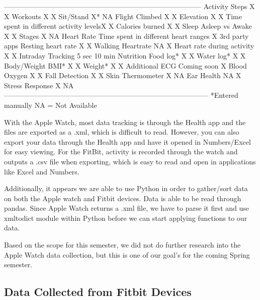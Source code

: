 \documentclass[]{book}
\begin{document}
---------------\textbar{}---------------------------------------\textbar{}---------------\textbar{}---------------
Activity \textbar{}Steps \textbar{}X \textbar{}X \textbar{}Workouts
\textbar{}X \textbar{}X \textbar{}Sit/Stand \textbar{}X* \textbar{}NA
\textbar{}Flight Climbed \textbar{}X \textbar{}X \textbar{}Elevation
\textbar{}X \textbar{}X \textbar{}Time spent in different activity
levels\textbar{}X \textbar{}X \textbar{}Calories burned \textbar{}X
\textbar{}X Sleep \textbar{}Asleep vs Awake \textbar{}X \textbar{}X
\textbar{}Stages \textbar{}X \textbar{}NA Heart Rate \textbar{}Time
spent in different heart ranges \textbar{}X \textbar{}3rd party apps
\textbar{}Resting heart rate \textbar{}X \textbar{}X \textbar{}Walking
Heartrate \textbar{}NA \textbar{}X \textbar{}Heart rate during activity
\textbar{}X \textbar{}X \textbar{}Intraday Tracking \textbar{}5 sec
\textbar{}10 min Nutrition \textbar{}Food log* \textbar{}X \textbar{}X
\textbar{}Water log* \textbar{}X \textbar{}X Body/Weight \textbar{}BMI*
\textbar{}X \textbar{}X \textbar{}Weight* \textbar{}X \textbar{}X
Additional \textbar{}ECG \textbar{}Coming soon \textbar{}X
\textbar{}Blood Oxygen \textbar{}X \textbar{}X \textbar{}Fall Detection
\textbar{}X \textbar{}X \textbar{}Skin Thermometer \textbar{}X
\textbar{}NA \textbar{}Ear Health \textbar{}NA \textbar{}X
\textbar{}Stress Response \textbar{}X \textbar{}NA
---------------------------------------------------------------------------------------
*Entered manually NA = Not Available

With the Apple Watch, most data tracking is through the Health app and
the files are exported as a .xml, which is difficult to read. However,
you can also export your data through the Health app and have it opened
in Numbers/Excel for easy viewing. For the FitBit, activity is recorded
through the watch and outputs a .csv file when exporting, which is easy
to read and open in applications like Excel and Numbers.

Additionally, it appears we are able to use Python in order to
gather/sort data on both the Apple watch and Fitbit devices. Data is
able to be read through pandas. Since Apple Watch returns a .xml file,
we have to parse it first and use xmltodict module within Python before
we can start applying functions to our data.

Based on the scope for this semester, we did not do further research
into the Apple Watch data collection, but this is one of our goal's for
the coming Spring semester.

\subsection{Data Collected from Fitbit
Devices}\label{data-collected-from-fitbit-devices}
\end{document}
